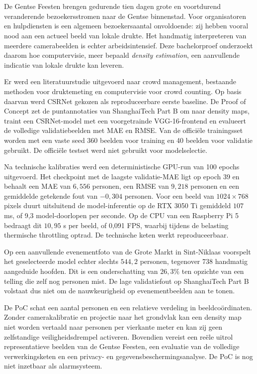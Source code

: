 
\chapter*{}

De Gentse Feesten brengen gedurende tien dagen grote en voortdurend veranderende bezoekersstromen naar de Gentse binnenstad. Voor organisatoren en hulpdiensten is een algemeen bezoekersaantal onvoldoende: zij hebben vooral nood aan een actueel beeld van lokale drukte. Het handmatig interpreteren van meerdere camerabeelden is echter arbeidsintensief. Deze bachelorproef onderzoekt daarom hoe computervisie, meer bepaald \emph{density estimation}, een aanvullende indicatie van lokale drukte kan leveren.

Er werd een literatuurstudie uitgevoerd naar crowd management, bestaande methoden voor druktemeting en computervisie voor crowd counting. Op basis daarvan werd CSRNet gekozen als reproduceerbare eerste baseline. De Proof of Concept zet de puntannotaties van ShanghaiTech Part B om naar density maps, traint een CSRNet-model met een voorgetrainde VGG-16-frontend en evalueert de volledige validatiebeelden met MAE en RMSE. Van de officiële trainingsset worden met een vaste seed 360 beelden voor training en 40 beelden voor validatie gebruikt. De officiële testset werd niet gebruikt voor modelselectie.

Na technische kalibraties werd een deterministische GPU-run van 100 epochs uitgevoerd. Het checkpoint met de laagste validatie-MAE ligt op epoch 39 en behaalt een MAE van \(6{,}556\) personen, een RMSE van \(9{,}218\) personen en een gemiddelde getekende fout van \(-0{,}304\) personen. Voor een beeld van \(1024 \times 768\) pixels duurt uitsluitend de model-inferentie op de RTX 3050 Ti gemiddeld \(107\) ms, of 9,3 model-doorlopen per seconde. Op de CPU van een Raspberry Pi 5 bedraagt dit \(10{,}95\) s per beeld, of 0,091 FPS, waarbij tijdens de belasting thermische throttling optrad. De technische keten werkt reproduceerbaar.

Op een aanvullende evenementfoto van de Grote Markt in Sint-Niklaas voorspelt het geselecteerde model echter slechts \(544{,}2\) personen, tegenover 738 handmatig aangeduide hoofden. Dit is een onderschatting van \(26{,}3\%\) ten opzichte van een telling die zelf nog personen mist. De lage validatiefout op ShanghaiTech Part B volstaat dus niet om de nauwkeurigheid op evenementbeelden aan te tonen.

De PoC schat een aantal personen en een relatieve verdeling in beeldcoördinaten. Zonder camerakalibratie en projectie naar het grondvlak kan een density map niet worden vertaald naar personen per vierkante meter en kan zij geen zelfstandige veiligheidsdrempel activeren. Bovendien vereist een reële uitrol representatieve beelden van de Gentse Feesten, een evaluatie van de volledige verwerkingsketen en een privacy- en gegevensbeschermingsanalyse. De PoC is nog niet inzetbaar als alarmsysteem.
